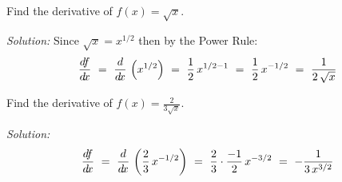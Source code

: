 \begin{exmp}\label{exmp:derivsqrtx}
 Find the derivative of $f(x) = \sqrt{x}$.\vspace{1mm}
 \par\noindent\emph{Solution:} Since $\sqrt{x} = x^{1/2}$ then by the Power
 Rule:
 \begin{displaymath}
  \frac{d\negmedspace f}{d\!x} ~=~ \frac{d}{d\!x}\,\left(x^{1/2}\right) ~=~ \frac{1}{2}\,x^{1/2 - 1} ~=~
            \frac{1}{2}\,x^{-1/2} ~=~
            \frac{1}{2\,\sqrt{x}}
 \end{displaymath}
\end{exmp}
\begin{exmp}\label{exmp:deriv1oversqrtx}
 Find the derivative of $f(x) = \frac{2}{3\sqrt{x}}$.\vspace{1mm}
 \par\noindent\emph{Solution:}
 \begin{displaymath}
  \frac{d\negmedspace f}{d\!x} ~=~ \frac{d}{d\!x}\,\left(\frac{2}{3}\,x^{-1/2}\right) ~=~
            \frac{2}{3} \cdot \frac{-1}{2}\,x^{-3/2} ~=~
            -\frac{1}{3\,x^{3/2}}
 \end{displaymath}
\end{exmp}
\divider
\vspace{3mm}
\newpage
\startexercises\label{sec1dot5}
